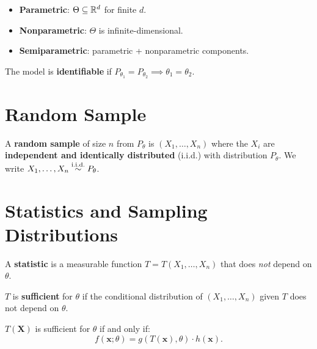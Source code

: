 \begin{definition}
\begin{itemize}
\item \textbf{Parametric}: $\Theta\subseteq\mathbb{R}^d$ for finite $d$.
\item \textbf{Nonparametric}: $\Theta$ is infinite-dimensional.
\item \textbf{Semiparametric}: parametric + nonparametric components.
\end{itemize}
\end{definition}

\begin{definition}[Identifiability]
The model is \textbf{identifiable} if $P_{\theta_1}=P_{\theta_2}\implies\theta_1=\theta_2$.
\end{definition}

\section{Random Sample}

\begin{definition}
A \textbf{random sample} of size $n$ from $P_\theta$ is $(X_1,\ldots,X_n)$ where the $X_i$ are \textbf{independent and identically distributed} (i.i.d.) with distribution $P_\theta$. We write $X_1,\ldots,X_n \overset{\text{i.i.d.}}{\sim} P_\theta$.
\end{definition}

\section{Statistics and Sampling Distributions}

\begin{definition}[Statistic]
A \textbf{statistic} is a measurable function $T=T(X_1,\ldots,X_n)$ that does \emph{not} depend on $\theta$.
\end{definition}

\begin{definition}
$T$ is \textbf{sufficient} for $\theta$ if the conditional distribution of $(X_1,\ldots,X_n)$ given $T$ does not depend on $\theta$.
\end{definition}

\begin{theorem}
$T(\mathbf{X})$ is sufficient for $\theta$ if and only if:
\[
f(\mathbf{x};\theta) = g(T(\mathbf{x}),\theta)\cdot h(\mathbf{x}).
\]
\end{theorem}

